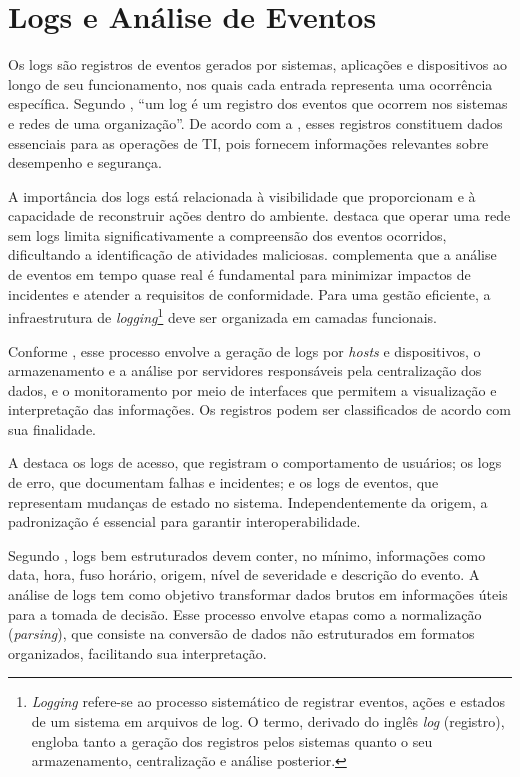 \documentclass[
    12pt
    ,oneside
    ,a4paper
    ,chapter=TITLE
    ,section=TITLE
    ,sumario=abnt-6027-2012]{abntex2}
\begin{document}
\chapter{Logs e Análise de Eventos}
\label{cap:logs}

Os logs são registros de eventos gerados por sistemas, aplicações e dispositivos ao longo de seu funcionamento, nos quais cada entrada representa uma ocorrência específica. Segundo , “um log é um registro dos eventos que ocorrem nos sistemas e redes de uma organização”. De acordo com a , esses registros constituem dados essenciais para as operações de TI, pois fornecem informações relevantes sobre desempenho e segurança.

A importância dos logs está relacionada à visibilidade que proporcionam e à capacidade de reconstruir ações dentro do ambiente.  destaca que operar uma rede sem logs limita significativamente a compreensão dos eventos ocorridos, dificultando a identificação de atividades maliciosas.  complementa que a análise de eventos em tempo quase real é fundamental para minimizar impactos de incidentes e atender a requisitos de conformidade. Para uma gestão eficiente, a infraestrutura de \textit{logging}\footnote{\textit{Logging} refere-se ao processo sistemático de registrar eventos, ações e estados de um sistema em arquivos de log. O termo, derivado do inglês \textit{log} (registro), engloba tanto a geração dos registros pelos sistemas quanto o seu armazenamento, centralização e análise posterior.} deve ser organizada em camadas funcionais.

Conforme , esse processo envolve a geração de logs por \textit{hosts} e dispositivos, o armazenamento e a análise por servidores responsáveis pela centralização dos dados, e o monitoramento por meio de interfaces que permitem a visualização e interpretação das informações. Os registros podem ser classificados de acordo com sua finalidade.

A  destaca os logs de acesso, que registram o comportamento de usuários; os logs de erro, que documentam falhas e incidentes; e os logs de eventos, que representam mudanças de estado no sistema. Independentemente da origem, a padronização é essencial para garantir interoperabilidade.

Segundo , logs bem estruturados devem conter, no mínimo, informações como data, hora, fuso horário, origem, nível de severidade e descrição do evento. A análise de logs tem como objetivo transformar dados brutos em informações úteis para a tomada de decisão. Esse processo envolve etapas como a normalização (\textit{parsing}), que consiste na conversão de dados não estruturados em formatos organizados, facilitando sua interpretação.
\end{document}
